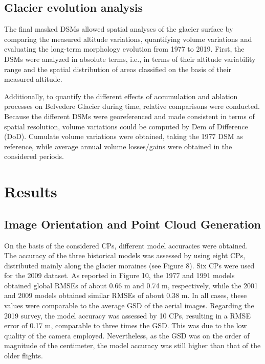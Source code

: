 \subsection{Glacier evolution analysis}{\label{sec:2:glacier_evolution}

The final masked DSMs allowed spatial analyses of the glacier surface by comparing the measured altitude variations, quantifying volume variations and evaluating the long-term morphology evolution from 1977 to 2019. 
First, the DSMs were analyzed in absolute terms, i.e., in terms of their altitude variability range and the spatial distribution of areas classified on the basis of their measured altitude. 

Additionally, to quantify the different effects of accumulation and ablation processes on Belvedere Glacier during time, relative comparisons were conducted.
Because the different DSMs were georeferenced and made consistent in terms of spatial resolution, volume variations could be computed by Dem of Difference (DoD).
Cumulate volume variations were obtained, taking the 1977 DSM as reference, while average annual volume losses/gains were obtained in the considered periods.

\section{Results}\label{sec:2:results}

\subsection{Image Orientation and Point Cloud Generation}\label{sec:2:res_reconstruction}

On the basis of the considered CPs, different model accuracies were obtained. 
The accuracy of the three historical models was assessed by using eight CPs, distributed mainly along the glacier moraines (see Figure 8). 
Six CPs were used for the 2009 dataset. As reported in Figure 10, the 1977 and 1991 models obtained global RMSEs of about 0.66 m and 0.74 m, respectively, while the 2001 and 2009 models obtained similar RMSEs of about 0.38 m.
In all cases, these values were comparable to the average GSD of the aerial images. Regarding the 2019 survey, the model accuracy was assessed by 10 CPs, resulting in a RMSE error of 0.17 m, comparable to three times the GSD. 
This was due to the low quality of the camera employed. 
Nevertheless, as the GSD was on the order of magnitude of the centimeter, the model accuracy was still higher than that of the older flights.

}
